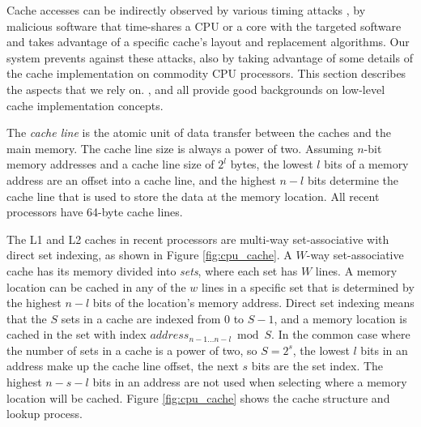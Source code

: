 Cache accesses can be indirectly observed by various timing attacks
\cite{banescu2011cache}, by malicious software that time-shares a CPU or a core
with the targeted software and takes advantage of a specific cache's layout
and replacement algorithms. Our system prevents against these attacks, also by
taking advantage of some details of the cache implementation on commodity CPU
processors. This section describes the aspects that we rely on.
\cite{smith1982cache}, \cite{patterson2013architecture} and
\cite{hennessy2012architecture} all provide good backgrounds on low-level cache
implementation concepts.

The \textit{cache line} is the atomic unit of data transfer between the caches
and the main memory. The cache line size is always a power of two. Assuming
$n$-bit memory addresses and a cache line size of $2^{l}$ bytes, the lowest
$l$ bits of a memory address are an offset into a cache line, and the highest
$n - l$ bits determine the cache line that is used to store the data at the
memory location. All recent processors have 64-byte cache lines.

The L1 and L2 caches in recent processors are multi-way set-associative with
direct set indexing, as shown in Figure \ref{fig:cpu_cache}. A $W$-way
set-associative cache has its memory divided into \textit{sets}, where each set
has $W$ lines. A memory location can be cached in any of the $w$ lines in a
specific set that is determined by the highest $n - l$ bits of the location's
memory address. Direct set indexing means that the $S$ sets in a cache are
indexed from $0$ to $S - 1$, and a memory location is cached in the set with
index $address_{n - 1 \ldots n - l} \bmod S$. In the common case where the
number of sets in a cache is a power of two, so $S = 2^{s}$, the lowest $l$
bits in an address make up the cache line offset, the next $s$ bits are the set
index. The highest $n - s - l$ bits in an address are not used when selecting
where a memory location will be cached. Figure \ref{fig:cpu_cache} shows the
cache structure and lookup process.

